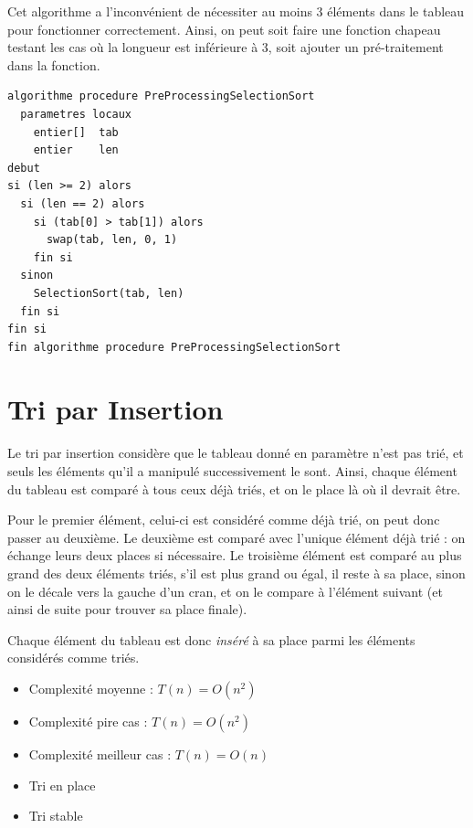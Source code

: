 \documentclass[11pt,a4paper]{article}
\begin{document}
\medskip

Cet algorithme a l'inconvénient de nécessiter au moins 3 éléments dans le tableau pour fonctionner correctement.
Ainsi, on peut soit faire une fonction chapeau testant les cas où la longueur est inférieure à 3, soit ajouter un pré-traitement dans la fonction.

\bigskip

\begin{table}[ht!]
  \centering
\begin{lstlisting}[style=algorithmique]
algorithme procedure PreProcessingSelectionSort
  parametres locaux
    entier[]  tab
    entier    len
debut
si (len >= 2) alors
  si (len == 2) alors
    si (tab[0] > tab[1]) alors
      swap(tab, len, 0, 1)
    fin si
  sinon
    SelectionSort(tab, len)
  fin si
fin si
fin algorithme procedure PreProcessingSelectionSort \end{lstlisting}
\end{table}


\clearpage


\section{Tri par Insertion}

\medskip

Le tri par insertion considère que le tableau donné en paramètre n'est pas trié, et seuls les éléments qu'il a manipulé successivement le sont.
Ainsi, chaque élément du tableau est comparé à tous ceux déjà triés, et on le place là où il devrait être.

\medskip

Pour le premier élément, celui-ci est considéré comme déjà trié, on peut donc passer au deuxième.
Le deuxième est comparé avec l'unique élément déjà trié : on échange leurs deux places si nécessaire.
Le troisième élément est comparé au plus grand des deux éléments triés, s'il est plus grand ou égal, il reste à sa place, sinon on le décale vers la gauche d'un cran, et on le compare à l'élément suivant (et ainsi de suite pour trouver sa place finale).

\medskip

Chaque élément du tableau est donc \textit{inséré} à sa place parmi les éléments considérés comme triés.

\medskip

\begin{itemize}
\item Complexité moyenne : $ T(n) = O(n^{2}) $
\item Complexité pire cas : $ T(n) = O(n^{2}) $
\item Complexité meilleur cas : $ T(n) = O(n) $
\item Tri en place
\item Tri stable
\end{itemize}
\end{document}
